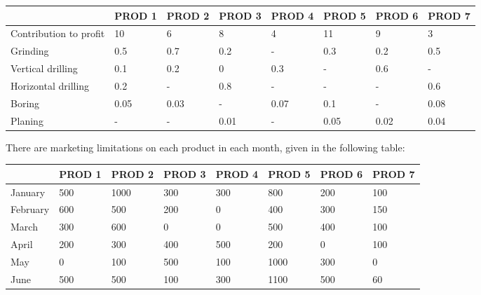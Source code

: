 \documentclass[12pt,a4paper]{article}
\theoremstyle{definition}
\begin{document}
\begin{enumerate}
	\begin{table}[htbp]
		\scriptsize
		\centering
		\renewcommand\arraystretch{1.1}
		\begin{tabular}{m{} m{}<{\centering} m{}<{\centering} m{}<{\centering} m{}<{\centering} m{}<{\centering} m{}<{\centering} m{}<{\centering}}
			\hline
			& \textbf{PROD 1} & \textbf{PROD 2} & \textbf{PROD 3} & \textbf{PROD 4} & \textbf{PROD 5} & \textbf{PROD 6} &  \textbf{PROD 7} \\\hline
			Contribution to profit & 10 & 6 & 8 & 4 & 11 & 9 & 3 \\
			Grinding & 0.5 & 0.7 & 0.2 & - & 0.3 & 0.2 & 0.5 \\
			Vertical drilling & 0.1 & 0.2 & 0 & 0.3 & - & 0.6 & - \\
			Horizontal drilling & 0.2 & - & 0.8 & - & - & - & 0.6 \\
			Boring & 0.05 & 0.03 & - & 0.07 & 0.1 & - & 0.08 \\
			Planing & - & - & 0.01 & - & 0.05 & 0.02 & 0.04 \\
			\hline
		\end{tabular}
	\end{table}
	
	There are marketing limitations on each product in each month, given in the following table:
	
	\begin{table}[htbp]
		\scriptsize
		\centering
		\renewcommand\arraystretch{1.1}
		\begin{tabular}{m{} m{}<{\centering} m{}<{\centering} m{}<{\centering} m{}<{\centering} m{}<{\centering} m{}<{\centering} m{}<{\centering}}
			\hline
			& \textbf{PROD 1} & \textbf{PROD 2} & \textbf{PROD 3} & \textbf{PROD 4} & \textbf{PROD 5} & \textbf{PROD 6} &  \textbf{PROD 7} \\\hline
			January & 500 & 1000 & 300 & 300 & 800 & 200 & 100 \\
			February & 600 & 500 & 200 & 0 & 400 & 300 & 150 \\
			March & 300 & 600 & 0 & 0 & 500 & 400 & 100 \\
			April & 200 & 300 & 400 & 500 & 200 & 0 & 100 \\
			May & 0 & 100 & 500 & 100 & 1000 & 300 & 0 \\
			June & 500 & 500 & 100 & 300 & 1100 & 500 & 60 \\
			\hline
		\end{tabular}
	\end{table}
	

\end{enumerate}
\end{document}
